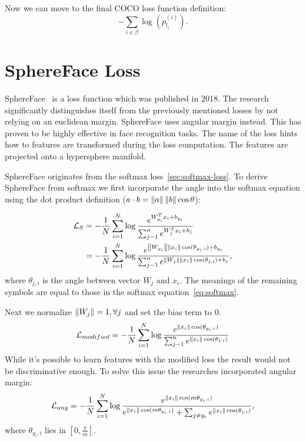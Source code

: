 Now we can move to the final COCO loss function definition:
\begin{equation}
    - \sum_{i \in \beta} \log \left( p_{l_i}^{(i)} \right).
\end{equation}

\section{SphereFace Loss}\label{sec:sphereface-loss}
SphereFace~\cite{SphereFace} is a loss function which was published in 2018.
The research significantly distinguishes itself from the previously mentioned losses by not relying on an euclidean
margin.
SphereFace uses angular margin instead.
This has proven to be highly effective in face recognition tasks.
The name of the loss hints how to features are transformed during the loss computation.
The features are projected onto a hypersphere manifold.

SphereFace originates from the softmax loss~\ref{sec:softmax-loss}.
To derive SphereFace from softmax we first incorporate the angle into the softmax equation using the dot
product definition ($a \cdot b = \left\lVert a\right\rVert \left\lVert b\right\rVert \cos \theta$):

\begin{align*}
    \mathcal{L}_S &= -\frac{1}{N} \sum_{i=1}^{N} \log \frac{e^{W^T_{y_i} x_{i} + b_{y_i}}}
    {\sum_{j-1}^{n} e^{W^T_{j} x_{i} + b_{j}}} \\
    &= -\frac{1}{N} \sum_{i=1}^{N} \log \frac{e^{\left\lVert W_{y_i}\right\rVert \left\lVert x_i\right\rVert \cos(\theta_{y_i,i}) + b_{y_i}}}
    {\sum_{j-1}^{n} e^{\left\lVert W_j\right\rVert \left\lVert x_{i}\right\rVert \cos(\theta_{j,i}) + b_{j}}},
\end{align*}
where $\theta_{j,i}$ is the angle between vector $W_j$ and $x_i$.
The meanings of the remaining symbols are equal to those in the softmax equation~\ref{eq:softmax}.


Next we normalize $\left\lVert W_j\right\rVert = 1, \forall j$ and set the bias term to 0.
\begin{equation}
    \label{eq:softmaxmod}
    \mathcal{L}_{modified} = -\frac{1}{N} \sum_{i=1}^{N} \log \frac{e^{\left\lVert x_i\right\rVert \cos(\theta_{y_i,i})}}
    {\sum_{j-1}^{n} e^{\left\lVert x_{i}\right\rVert \cos(\theta_{j,i})}}
\end{equation}
While it's possible to learn features with the modified loss the result would not be discriminative enough.
To solve this issue the researches incorporated angular margin:
\begin{equation}
    \label{eq:ang}
    \mathcal{L}_{ang} = -\frac{1}{N} \sum_{i=1}^{N} \log \frac{e^{\left\lVert x_i\right\rVert \cos(m\theta_{y_i,i})}}
    {e^{\left\lVert x_i\right\rVert \cos(m\theta_{y_i,i})} + \sum_{j \neq y_i} e^{\left\lVert x_{i}\right\rVert \cos(\theta_{j,i})}},
\end{equation}
where $\theta_{y_i,i}$ lies in $\left[ 0, \frac{\pi}{m} \right]$.

